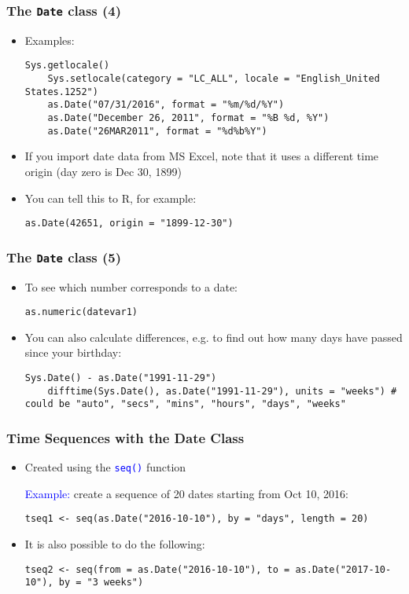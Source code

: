 \documentclass[10pt]{beamer}
\newcommand{\cc}[1]{\texttt{\textcolor{blue}{#1}}}
\theoremstyle{definition}
\begin{document}
\begin{frame}[fragile]
\frametitle{The \texttt{Date} class (4)}
\begin{itemize}
	\item Examples:
	\begin{lstlisting}[style = rstyle, breaklines]
	Sys.getlocale()
	Sys.setlocale(category = "LC_ALL", locale = "English_United States.1252")
	as.Date("07/31/2016", format = "%m/%d/%Y")
	as.Date("December 26, 2011", format = "%B %d, %Y")
	as.Date("26MAR2011", format = "%d%b%Y")
	\end{lstlisting}
	\item If you import date data from MS Excel, note that it uses a different time origin (day zero is Dec 30, 1899)
	\item You can tell this to R, for example:
	\begin{lstlisting}[style = rstyle, breaklines]
	as.Date(42651, origin = "1899-12-30")
	\end{lstlisting}
\end{itemize}
\end{frame}

\begin{frame}[fragile]
\frametitle{The \texttt{Date} class (5)}
\begin{itemize}
	\item To see which number corresponds to a date:
	\begin{lstlisting}[style = rstyle, breaklines]
	as.numeric(datevar1)
	\end{lstlisting}
	\item You can also calculate differences, e.g. to find out how many days have passed since your birthday:
	\begin{lstlisting}[style = rstyle, breaklines]
	Sys.Date() - as.Date("1991-11-29")
	difftime(Sys.Date(), as.Date("1991-11-29"), units = "weeks") # could be "auto", "secs", "mins", "hours", "days", "weeks"
	\end{lstlisting}
\end{itemize}
\end{frame}

\begin{frame}[fragile]
\frametitle{Time Sequences with the Date Class}
\begin{itemize}
	\item Created using the \cc{seq()} function
	
	\textcolor{blue}{Example:} create a sequence of 20 dates starting from Oct 10, 2016:
	\begin{lstlisting}[style = rstyle, breaklines]
	tseq1 <- seq(as.Date("2016-10-10"), by = "days", length = 20)
	\end{lstlisting}
	
	\item It is also possible to do the following:
	\begin{lstlisting}[style = rstyle, breaklines]
	tseq2 <- seq(from = as.Date("2016-10-10"), to = as.Date("2017-10-10"), by = "3 weeks")
	\end{lstlisting}
\end{itemize}
\end{frame}
\end{document}
